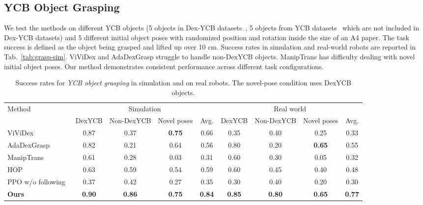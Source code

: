 \documentclass[letterpaper]{article}
\begin{document}
\subsection{YCB Object Grasping}
We test the methods on different YCB objects (5 objects in Dex-YCB datasets~\cite{chao2021dexycb}, 5 objects from YCB datasets~\cite{calli2015benchmarking} which are not included in Dex-YCB datasets) and 5 different initial object poses with randomized position and rotation inside the size of an A4 paper. The task success is defined as the object being grasped and lifted up over 10 cm. Success rates in simulation and real-world robots are reported in Tab.~\ref{tab:grasp-sim}. ViViDex and AdaDexGrasp struggle to handle non-DexYCB objects. ManipTrans has difficulty dealing with novel initial object poses. Our method demonstrates consistent performance across different task configurations.

\begin{table}[t]
\centering
\fontsize{9pt}{10.8pt}\selectfont
\renewcommand{\arraystretch}{1.15}
\setlength{\tabcolsep}{3pt}
\begin{tabular*}{\textwidth}{@{\extracolsep{\fill}}lcccccccc@{}}
\toprule
Method & \multicolumn{4}{c}{Simulation} & \multicolumn{4}{c}{Real world} \\
\cmidrule(lr){2-5}\cmidrule(lr){6-9}
 & DexYCB & Non-DexYCB & Novel poses & Avg. & DexYCB & Non-DexYCB & Novel poses & Avg. \\
\midrule
ViViDex~\cite{chen2024vividex} & 0.87 & 0.37 & \textbf{0.75} & 0.66 & 0.35 & 0.40 & 0.25 & 0.33 \\
AdaDexGrasp~\cite{shi2025learning} & 0.82 & 0.21 & 0.64 & 0.56 & 0.80 & 0.20 & \textbf{0.65} & 0.55 \\
ManipTrans~\cite{li2025maniptrans} & 0.61 & 0.28 & 0.03 & 0.31 & 0.60 & 0.30 & 0.05 & 0.32 \\
HOP~\cite{singh2024hand} & 0.63 & 0.59 & 0.54 & 0.59 & 0.60 & 0.45 & 0.40 & 0.48 \\
PPO w/o following~\cite{schulman2017proximal} & 0.37 & 0.42 & 0.27 & 0.35 & 0.30 & 0.40 & 0.20 & 0.30 \\
\midrule
\textbf{Ours} & \textbf{0.90} & \textbf{0.86} & \textbf{0.75} & \textbf{0.84} & \textbf{0.85} & \textbf{0.80} & \textbf{0.65} & \textbf{0.77} \\
\bottomrule
\end{tabular*}
\caption{Success rates for \textit{YCB object grasping} in simulation and on real robots. The novel-pose condition uses DexYCB objects.}
\label{tab:grasp-sim}
\label{tab:grasp-real}
\end{table}
\end{document}
